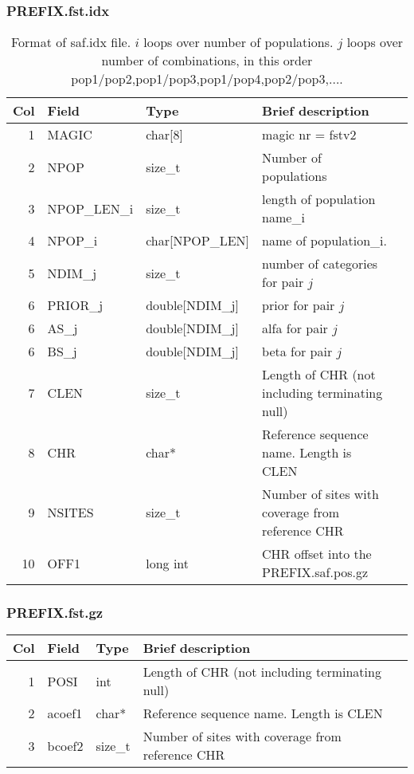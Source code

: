 \documentclass[10pt]{article}
\begin{document}
\subsubsection{PREFIX.fst.idx}
\begin{table}[h]
\begin{tabular}{rllll}
  \hline
  {\bf Col} & {\bf Field} & {\bf Type} & {\bf Brief description} \\
  \hline
  1 & {\sf MAGIC} & char[8] &  magic nr = fstv2\\
  2 & {\sf NPOP} & size\_t &  Number of populations\\
  \hline \hline
  3 & {\sf NPOP\_LEN\_i} & size\_t &  length of population name\_i\\
  4 & {\sf NPOP\_i} & char[NPOP\_LEN] &  name of population\_i.\\
  \hline\hline
  5 & {\sf NDIM\_j} & size\_t & number of categories for pair $j$   \\
  6 & {\sf PRIOR\_j} & double[NDIM\_j] &  prior for pair $j$\\
  \hline\hline
  6 & {\sf AS\_j} & double[NDIM\_j] &  alfa for pair $j$\\
  6 & {\sf BS\_j} & double[NDIM\_j] &  beta for pair $j$\\
  \hline\hline
  7 & {\sf CLEN} & size\_t &  Length of CHR (not including terminating null)\\
  8 & {\sf CHR} & char* & Reference sequence name. Length is CLEN\\
  9 & {\sf NSITES} & size\_t & Number of sites with coverage from reference CHR\\
  10 & {\sf OFF1} & long int & CHR offset into the PREFIX.saf.pos.gz \\
  \hline
\end{tabular}\label{tab4}
\caption{Format of saf.idx file. $i$ loops over number of populations. $j$ loops over number of combinations, in this order pop1/pop2,pop1/pop3,pop1/pop4,pop2/pop3,$\ldots$.}
\end{table}
\subsubsection{PREFIX.fst.gz}
\begin{table}[h]
\begin{tabular}{rllll}
  \hline
  {\bf Col} & {\bf Field} & {\bf Type} & {\bf Brief description} \\
  \hline
  1 & {\sf POSI} & int &  Length of CHR (not including terminating null)\\
  2 & {\sf acoef1} & char* & Reference sequence name. Length is CLEN\\
  3 & {\sf bcoef2} & size\_t & Number of sites with coverage from reference CHR\\
  \hline
\end{tabular}\label{tab5}
\end{table}
\end{document}

